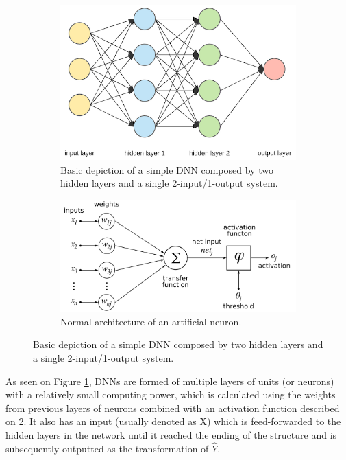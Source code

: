 \documentclass[12pt]{report}
\begin{document}
\begin{figure}[H]
	\begin{subfigure}{0.65\linewidth}  
		\centering
		\includegraphics[width=\linewidth]{Figuras_tfg/Figure2_tfg}
		\caption{Basic depiction of a simple DNN composed by two hidden layers and a single 2-input/1-output system.}
		\label{fig:fig2a} 
	\end{subfigure}
	
	\begin{subfigure}{0.65\linewidth} 
		\centering
		\includegraphics[width=\linewidth]{Figuras_tfg/ArtificialNeuronModel_english.png}
		\caption{Normal architecture of an artificial neuron.}
		\label{fig:fig2b} 
	\end{subfigure}
	\caption{Basic depiction of a simple DNN composed by two hidden layers and a single 2-input/1-output system.}
	\label{fig:fig2}
\end{figure}

As seen on Figure \ref{fig:fig2a}, DNNs are formed of multiple layers of units (or neurons) with a relatively small computing power, which is calculated using the weights from previous layers of neurons combined with an activation function described on \ref{fig:fig2b}. It also has an input (usually denoted as X) which is feed-forwarded to the hidden layers in the network until it reached the ending of the structure and is subsequently outputted as the transformation of $\hat{Y}$. 
\end{document}

